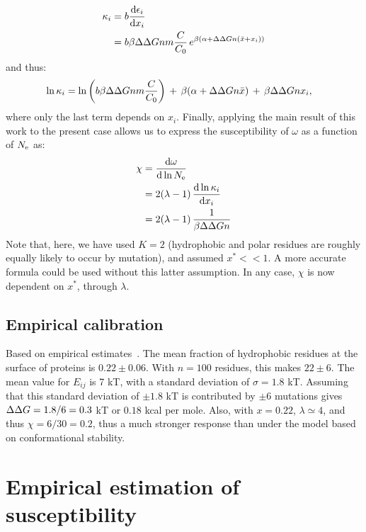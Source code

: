 \begin{align}
\kappa_i & = b \frac{\mathrm{d}\epsilon_i} {\mathrm{d} x_i}
\\ & =
b \beta \Delta \Delta G n m \frac{C}{C_0} \, e^{\beta (\alpha +\Delta \Delta G n (\bar x + x_i))}
\end{align}
and thus:
\begin{align}
\ln \kappa_i & = \ln \left( b \beta \Delta \Delta G n m \frac{C}{C_0}  \right) \, + \, \beta (\alpha +\Delta \Delta G n \bar x) \, + \, \beta \Delta \Delta Gn x_i,
\end{align}
where only the last term depends on $x_i$.
Finally, applying the main result of this work to the present case allows us to express the susceptibility of $\omega$ as a function of $N_{\mathrm{e}}$ as:
\begin{align}
\chi & = \frac{\mathrm{d}\omega} {\mathrm{d} \ln N_{\mathrm{e}}}
\\ & =  2(\lambda - 1) \, \frac{\mathrm{d}\ln \kappa_i}{\mathrm{d} x_i}
\\ & =  2 (\lambda - 1) \, \frac{1}{\beta \Delta \Delta G n}
\end{align}
Note that, here, we have used $K=2$ (hydrophobic and polar residues are roughly equally likely to occur by mutation), and assumed $x^* << 1$. A more accurate formula could be used without this latter assumption. In any case, $\chi$ is now dependent on $x^*$, through $\lambda$.

\subsection{Empirical calibration}
\label{subsec:empirical-calibration}

Based on empirical estimates~\citep{Zhang2008}.
The mean fraction of hydrophobic residues at the surface of proteins is $0.22 \pm 0.06$. With $n=100$ residues, this makes $22 \pm 6$.
The mean value for $E_{ij}$ is 7 kT, with a standard deviation of $\sigma = 1.8$ kT. Assuming that this standard deviation of $\pm 1.8$ kT is contributed by $\pm 6$ mutations gives $\Delta \Delta G = 1.8 / 6 = 0.3$ kT or $0.18$ kcal per mole.
Also, with $x=0.22$, $\lambda \simeq 4$, and thus $\chi = 6  / 30 = 0.2$, thus a much stronger response than under the model based on conformational stability.

\section{Empirical estimation of susceptibility}
\label{sec:empirical-estimation-of-susceptibility}

